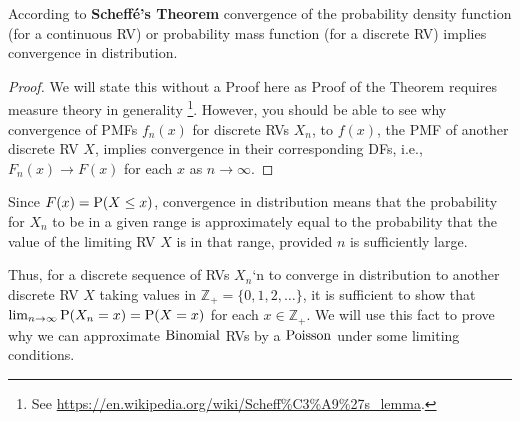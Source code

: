 \begin{prop}
According to {\bf Scheff\'e's Theorem} convergence of the probability density function (for a continuous RV) or probability mass function (for a discrete RV) implies convergence in distribution.
\begin{proof}
We will state this without a Proof here as Proof of the Theorem requires measure theory in generality \footnote{See \url{https://en.wikipedia.org/wiki/Scheff\%C3\%A9\%27s_lemma}.}. However, you should be able to see why convergence of PMFs $f_n(x)$ for discrete RVs $X_n$, to $f(x)$, the PMF of another discrete RV $X$, implies convergence in their corresponding DFs, i.e., $F_n(x) \to F(x)$ for each $x$ as $n \to \infty$. 
\end{proof}
\end{prop}

Since $F(x) = \P(X \leq x)$, convergence in distribution means that the probability for $X_n$ to be in a given range is approximately equal to the probability that the value of the limiting RV $X$ is in that range, provided $n$ is sufficiently large. 

Thus, for a discrete sequence of RVs $X_n$`n to converge in distribution to another discrete RV $X$ taking values in $\mathbb{Z}_+ = \{0,1,2,\ldots\}$, it is sufficient to show that $\lim_{n \to \infty}\P(X_n = x) = \P(X=x)$ for each $x \in \mathbb{Z_+}$.  
We will use this fact to prove why we can approximate $\binomial$ RVs by a $\poisson$ under some limiting conditions.

